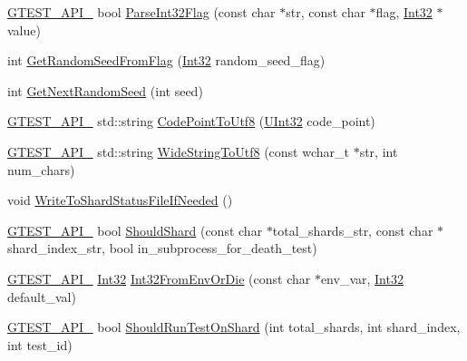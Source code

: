 \begin{DoxyCompactItemize}
\item 
\hyperlink{gtest-port_8h_aa73be6f0ba4a7456180a94904ce17790}{G\+T\+E\+S\+T\+\_\+\+A\+P\+I\+\_\+} bool \hyperlink{namespacetesting_1_1internal_ae3449e173767750b613114ceac6d916a}{Parse\+Int32\+Flag} (const char $\ast$str, const char $\ast$flag, \hyperlink{namespacetesting_1_1internal_a8ee38faaf875f133358abaf9bc056cec}{Int32} $\ast$value)
\item 
int \hyperlink{namespacetesting_1_1internal_ae74fedbdaebaac8d1202192266243b9e}{Get\+Random\+Seed\+From\+Flag} (\hyperlink{namespacetesting_1_1internal_a8ee38faaf875f133358abaf9bc056cec}{Int32} random\+\_\+seed\+\_\+flag)
\item 
int \hyperlink{namespacetesting_1_1internal_a6e07a655cb987d131cd8fbeba9a7f1eb}{Get\+Next\+Random\+Seed} (int seed)
\item 
\hyperlink{gtest-port_8h_aa73be6f0ba4a7456180a94904ce17790}{G\+T\+E\+S\+T\+\_\+\+A\+P\+I\+\_\+} std\+::string \hyperlink{namespacetesting_1_1internal_a0c0f9558efb9abb965851c4738cdc725}{Code\+Point\+To\+Utf8} (\hyperlink{namespacetesting_1_1internal_a40d4fffcd2bf56f18b1c380615aa85e3}{U\+Int32} code\+\_\+point)
\item 
\hyperlink{gtest-port_8h_aa73be6f0ba4a7456180a94904ce17790}{G\+T\+E\+S\+T\+\_\+\+A\+P\+I\+\_\+} std\+::string \hyperlink{namespacetesting_1_1internal_a05b8c86ff38243f34d8f839a0eadefb1}{Wide\+String\+To\+Utf8} (const wchar\+\_\+t $\ast$str, int num\+\_\+chars)
\item 
void \hyperlink{namespacetesting_1_1internal_a19b35b39782d41e6ef76e1910a3a502e}{Write\+To\+Shard\+Status\+File\+If\+Needed} ()
\item 
\hyperlink{gtest-port_8h_aa73be6f0ba4a7456180a94904ce17790}{G\+T\+E\+S\+T\+\_\+\+A\+P\+I\+\_\+} bool \hyperlink{namespacetesting_1_1internal_a0fe41657b1d1ab7ec4e37ec07403ee6c}{Should\+Shard} (const char $\ast$total\+\_\+shards\+\_\+str, const char $\ast$shard\+\_\+index\+\_\+str, bool in\+\_\+subprocess\+\_\+for\+\_\+death\+\_\+test)
\item 
\hyperlink{gtest-port_8h_aa73be6f0ba4a7456180a94904ce17790}{G\+T\+E\+S\+T\+\_\+\+A\+P\+I\+\_\+} \hyperlink{namespacetesting_1_1internal_a8ee38faaf875f133358abaf9bc056cec}{Int32} \hyperlink{namespacetesting_1_1internal_aaa576613655c2f380278c255c3ec5fef}{Int32\+From\+Env\+Or\+Die} (const char $\ast$env\+\_\+var, \hyperlink{namespacetesting_1_1internal_a8ee38faaf875f133358abaf9bc056cec}{Int32} default\+\_\+val)
\item 
\hyperlink{gtest-port_8h_aa73be6f0ba4a7456180a94904ce17790}{G\+T\+E\+S\+T\+\_\+\+A\+P\+I\+\_\+} bool \hyperlink{namespacetesting_1_1internal_a437bd89f5bc532778d7467600e210395}{Should\+Run\+Test\+On\+Shard} (int total\+\_\+shards, int shard\+\_\+index, int test\+\_\+id)

\end{DoxyCompactItemize}
